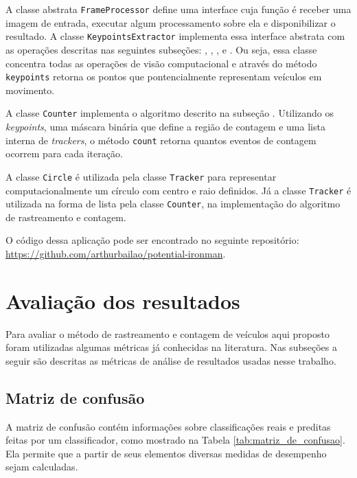 A classe abstrata \verb!FrameProcessor! define uma interface cuja função é receber uma imagem de entrada, executar algum processamento sobre ela e disponibilizar o resultado. A classe \verb!KeypointsExtractor! implementa essa interface abstrata com as operações descritas nas seguintes subseções: , , ,  e . Ou seja, essa classe concentra todas as operações de visão computacional e através do método \verb!keypoints! retorna os pontos que pontencialmente representam veículos em movimento.

A classe \verb!Counter! implementa o algoritmo descrito na subseção . Utilizando os \textit{keypoints}, uma máscara binária que define a região de contagem e uma lista interna de \textit{trackers}, o método \verb!count! retorna quantos eventos de contagem ocorrem para cada iteração.

A classe \verb!Circle! é utilizada pela classe \verb!Tracker! para representar computacionalmente um círculo com centro e raio definidos. Já a classe \verb!Tracker! é utilizada na forma de lista pela classe \verb!Counter!, na implementação do algoritmo de rastreamento e contagem.

O código dessa aplicação pode ser encontrado no seguinte repositório: \url{https://github.com/arthurbailao/potential-ironman}.


\section{Avaliação dos resultados} %
\label{sec:avalia_o_dos_resultados}

Para avaliar o método de rastreamento e contagem de veículos aqui proposto foram utilizadas algumas métricas já conhecidas na literatura. Nas subseções a seguir são descritas as métricas de análise de resultados usadas nesse trabalho.

\subsection{Matriz de confusão} %
\label{sub:matriz_de_confus_o}

A matriz de confusão contém informações sobre classificações reais e preditas feitas por um classificador, como mostrado na Tabela \ref{tab:matriz_de_confusao}. Ela permite que a partir de seus elementos diversas medidas de desempenho sejam calculadas.

